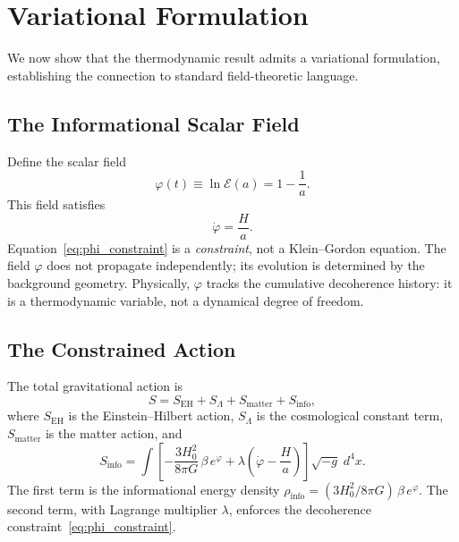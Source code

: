 \documentclass[twocolumn,a4paper,aps,prd,twocolumn,showpacs,notitlepage,superscriptaddress,nofootinbib]{article}
\begin{document}
\section{Variational Formulation}
\label{sec:action}

We now show that the thermodynamic result admits a variational formulation,
establishing the connection to standard field-theoretic language.

\subsection{The Informational Scalar Field}

Define the scalar field
\begin{equation}
\varphi(t) \equiv \ln\mathcal{E}(a) = 1 - \frac{1}{a}.
\label{eq:phi_def}
\end{equation}
This field satisfies
\begin{equation}
\dot{\varphi} = \frac{H}{a}.
\label{eq:phi_constraint}
\end{equation}
Equation~\eqref{eq:phi_constraint} is a \emph{constraint}, not a
Klein--Gordon equation.  The field $\varphi$ does not propagate
independently; its evolution is determined by the background geometry.
Physically, $\varphi$ tracks the cumulative decoherence history: it is a
thermodynamic variable, not a dynamical degree of freedom.

\subsection{The Constrained Action}

The total gravitational action is
\begin{equation}
S = S_\mathrm{EH} + S_\Lambda + S_\mathrm{matter} + S_\mathrm{info},
\label{eq:total_action}
\end{equation}
where $S_\mathrm{EH}$ is the Einstein--Hilbert action, $S_\Lambda$ is the
cosmological constant term, $S_\mathrm{matter}$ is the matter action, and
\begin{equation}
S_\mathrm{info} = \int\!\left[
  -\frac{3H_0^2}{8\pi G}\,\beta\,e^{\varphi}
  + \lambda\!\left(\dot{\varphi} - \frac{H}{a}\right)
\right]\sqrt{-g}\;d^4x.
\label{eq:Sinfo}
\end{equation}
The first term is the informational energy density
$\rho_\mathrm{info} = (3H_0^2/8\pi G)\,\beta\,e^{\varphi}$.  The second
term, with Lagrange multiplier $\lambda$, enforces the decoherence
constraint~\eqref{eq:phi_constraint}.
\end{document}
